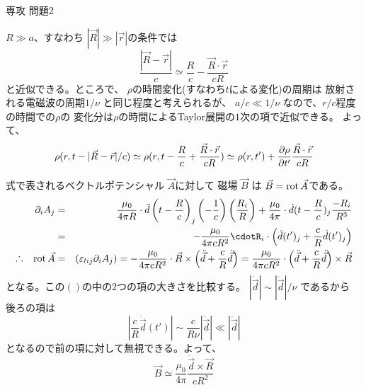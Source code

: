 \documentclass[fleqn]{jbook}
\begin{document}
\begin{answer}{専攻 問題2}{}

\begin{subanswers}
\SubAnswer
  $R\gg a$、すなわち  $|\vec{R}|\gg|\vec{r}|$の条件では
%
  \[ \frac{|\vec{R}-\vec{r}|}{c} \simeq%
     \frac{R}{c} - \frac{\vec{R}\cdot\vec{r}}{cR} \]
%
  と近似できる。ところで、
  $\rho$の時間変化(すなわち$t$による変化)の周期は
  放射される電磁波の周期$1/\nu$ と同じ程度と考えられるが、
  $a/c \ll 1/\nu$ なので、$r/c$程度の時間での$\rho$の
  変化分は$\rho$の時間によるTaylor展開の$1$次の項で近似できる。
  よって、
%
  \[ \rho(r,t-|\vec{R}-\vec{r}|/c )%
     \simeq \rho(r,t-\frac{R}{c}+\frac{\vec{R}\cdot{\vec{r}}}{cR})%
     \simeq \rho(r,t')%
     +\Partial{\rho}{t'}\frac{\vec{R}\cdot{\vec{r}}}{cR} \]
%


\SubAnswer
  式で表されるベクトルポテンシャル $\vec{A}$に対して
  磁場 $\vec{B}$ は $\vec{B}={\rm rot\,}\vec{A}$である。
%
  \begin{eqnarray*}
    \partial_iA_j%
      &=& \frac{\mu_0}{4\pi R}\cdot%
          \ddot{d}\left(t-\frac{R}{c}\right)_j%
          \left(-\frac{1}{c}\right)%
          \left(\frac{R_i}{R}\right)%
        + \frac{\mu_0}{4\pi}\cdot%
          \dot{d}(t-\frac{R}{c})_j \frac{-R_i}{R^3} \\
      &=& - \frac{\mu_0}{4\pi cR^2}\cdot%
          R_i\cdot\left(\ddot{d}(t')_j+\frac{c}{R}\dot{d}(t')_j\right)\\
      \Yueni \Rot{\vec{A}} %
      &=& (\varepsilon_{lij}\partial_i A_j)%
       = - \frac{\mu_0}{4\pi cR^2}\cdot \vec{R}\times%
         \left(\ddot{\vec{d}}+\frac{c}{R}\dot{\vec{d}}\right)%
       = \frac{\mu_0}{4\pi cR^2}\cdot%
         \left(\ddot{\vec{d}}+\frac{c}{R}\dot{\vec{d}}\right)%
         \times\vec{R}
  \end{eqnarray*}
%
  となる。この$( )$の中の$2$つの項の大きさを比較する。
  $|\dot{\vec{d}}| \sim |\ddot{\vec{d}}|/\nu$ であるから
  後ろの項は
%
  \[ |\frac{c}{R}\dot{\vec{d}}(t')|%
     \sim \frac{c}{R\nu} |\ddot{\vec{d}}| \ll |\ddot{\vec{d}}| \]
%
  となるので前の項に対して無視できる。よって、
%
  \[ \vec{B} \simeq \frac{\mu_0}{4\pi}\frac{\ddot{\vec{d}}
                    \times\vec{R}}{cR^2} \]




\end{subanswers}
\end{answer}
\end{document}

